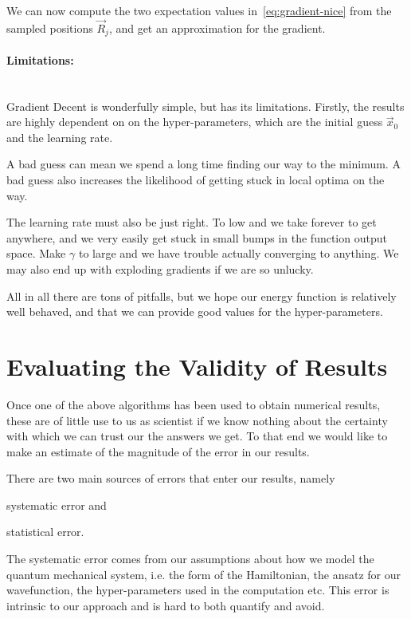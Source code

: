 \documentclass[twocolumn]{article}
\begin{document}
We can now compute the two expectation values in~\eqref{eq:gradient-nice} from
the sampled positions $\vec R_j$, and get an approximation for the gradient.

\paragraph{Limitations:}$\,$\\
Gradient Decent is wonderfully simple, but has its limitations. Firstly, the
results are highly dependent on on the hyper-parameters, which are the initial
guess $\vec x_0$ and the learning rate.

A bad guess can mean we spend a long time finding our way to the minimum. A bad
guess also increases the likelihood of getting stuck in local optima on the way.

The learning rate must also be just right. To low and we take forever to get
anywhere, and we very easily get stuck in small bumps in the function output
space. Make $\gamma$ to large and we have trouble actually converging to
anything. We may also end up with exploding gradients if we are so unlucky.

All in all there are tons of pitfalls, but we hope our energy function is
relatively well behaved, and that we can provide good values for the
hyper-parameters.

\section{Evaluating the Validity of Results}
\label{sec:statistical-analisys}

Once one of the above algorithms has been used to obtain numerical results,
these are of little use to us as scientist if we know nothing about the
certainty with which we can trust our the answers we get. To that end we would
like to make an estimate of the magnitude of the error in our results.

There are two main sources of errors that enter our results, namely 
\begin{inparaenum}[1)]
    \item systematic error and
    \item statistical error.
\end{inparaenum}
The systematic error comes from our assumptions about how we model the quantum
mechanical system, i.e. the form of the Hamiltonian, the ansatz for our
wavefunction, the hyper-parameters used in the computation etc. This error is
intrinsic to our approach and is hard to both quantify and avoid.
\end{document}
